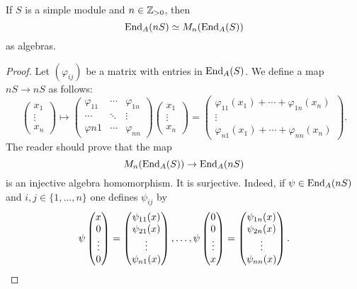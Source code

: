 \begin{lemma}
	\label{lem:simple}
	If $S$ is a simple module and $n\in\mathbb{Z}_{>0}$, then  
	\[
		\operatorname{End}_A(nS)\simeq M_n(\operatorname{End}_A(S))
	\]
	as algebras.
\end{lemma}

\begin{proof}
	Let $(\varphi_{ij})$ be a matrix with entries in $\operatorname{End}_A(S)$. We define a map
	$nS\to nS$ as follows:
	\[
	\begin{pmatrix}
	x_1\\
	\vdots\\
	x_n	
	\end{pmatrix}
	\mapsto 
		\begin{pmatrix}
			\varphi_{11} & \cdots & \varphi_{1n}\\
			\cdots & \ddots & \vdots\\
			\varphi{n1} & \cdots & \varphi_{nn}
		\end{pmatrix}
		\begin{pmatrix}
		x_1\\
		\vdots\\
		x_n	
		\end{pmatrix}
		=\begin{pmatrix}
			\varphi_{11}(x_1)+\cdots+\varphi_{1n}(x_n)\\
			\vdots\\
			\varphi_{n1}(x_1)+\cdots+\varphi_{nn}(x_n)
		\end{pmatrix}.
	\]
	The reader should prove that the map  
	\[
		M_n(\operatorname{End}_A(S))\to\operatorname{End}_A(nS)
	\]
	is an injective algebra homomorphism. 
	It is surjective. Indeed, if $\psi\in\operatorname{End}_A(nS)$ and 
	$i,j\in\{1,\dots,n\}$ one defines $\psi_{ij}$ by 
	\[
		\psi\begin{pmatrix}
		x\\
		0\\
		\vdots\\
		0	
		\end{pmatrix}
		=\begin{pmatrix}
		\psi_{11}(x)\\
		\psi_{21}(x)\\
		\vdots\\
		\psi_{n1}(x)
		\end{pmatrix},\dots,
		\psi\begin{pmatrix}
		0\\
		0\\
		\vdots\\
		x	
		\end{pmatrix}
		=\begin{pmatrix}
		\psi_{1n}(x)\\
		\psi_{2n}(x)\\
		\vdots\\
		\psi_{nn}(x)
		\end{pmatrix}.\qedhere
	\]
\end{proof}

